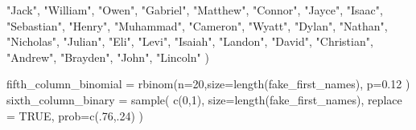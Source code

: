 \documentclass[
]{article}
\newenvironment{Shaded}{\begin{snugshade}}{\end{snugshade}}
\newcommand{\AttributeTok}[1]{\textcolor[rgb]{0.77,0.63,0.00}{#1}}
\newcommand{\ConstantTok}[1]{\textcolor[rgb]{0.00,0.00,0.00}{#1}}
\newcommand{\DecValTok}[1]{\textcolor[rgb]{0.00,0.00,0.81}{#1}}
\newcommand{\FloatTok}[1]{\textcolor[rgb]{0.00,0.00,0.81}{#1}}
\newcommand{\FunctionTok}[1]{\textcolor[rgb]{0.00,0.00,0.00}{#1}}
\newcommand{\NormalTok}[1]{#1}
\newcommand{\OtherTok}[1]{\textcolor[rgb]{0.56,0.35,0.01}{#1}}
\newcommand{\StringTok}[1]{\textcolor[rgb]{0.31,0.60,0.02}{#1}}
\begin{document}
\begin{Shaded}
\begin{Highlighting}[]
  \StringTok{"Jack"}\NormalTok{, }\StringTok{"William"}\NormalTok{, }\StringTok{"Owen"}\NormalTok{, }\StringTok{"Gabriel"}\NormalTok{, }\StringTok{"Matthew"}\NormalTok{, }\StringTok{"Connor"}\NormalTok{, }\StringTok{"Jayce"}\NormalTok{, }
  \StringTok{"Isaac"}\NormalTok{, }\StringTok{"Sebastian"}\NormalTok{, }\StringTok{"Henry"}\NormalTok{, }\StringTok{"Muhammad"}\NormalTok{, }\StringTok{"Cameron"}\NormalTok{, }\StringTok{"Wyatt"}\NormalTok{, }
  \StringTok{"Dylan"}\NormalTok{, }\StringTok{"Nathan"}\NormalTok{, }\StringTok{"Nicholas"}\NormalTok{, }\StringTok{"Julian"}\NormalTok{, }\StringTok{"Eli"}\NormalTok{, }\StringTok{"Levi"}\NormalTok{, }\StringTok{"Isaiah"}\NormalTok{, }
  \StringTok{"Landon"}\NormalTok{, }\StringTok{"David"}\NormalTok{, }\StringTok{"Christian"}\NormalTok{, }\StringTok{"Andrew"}\NormalTok{, }\StringTok{"Brayden"}\NormalTok{, }\StringTok{"John"}\NormalTok{, }
  \StringTok{"Lincoln"}
\NormalTok{)}


\NormalTok{fifth\_column\_binomial }\OtherTok{=} \FunctionTok{rbinom}\NormalTok{(}\AttributeTok{n=}\DecValTok{20}\NormalTok{,}\AttributeTok{size=}\FunctionTok{length}\NormalTok{(fake\_first\_names), }\AttributeTok{p=}\FloatTok{0.12}\NormalTok{ )}
\NormalTok{sixth\_column\_binary }\OtherTok{=} \FunctionTok{sample}\NormalTok{(}
   \FunctionTok{c}\NormalTok{(}\DecValTok{0}\NormalTok{,}\DecValTok{1}\NormalTok{),}
   \AttributeTok{size=}\FunctionTok{length}\NormalTok{(fake\_first\_names),}
   \AttributeTok{replace =} \ConstantTok{TRUE}\NormalTok{,}
   \AttributeTok{prob=}\FunctionTok{c}\NormalTok{(.}\DecValTok{76}\NormalTok{,.}\DecValTok{24}\NormalTok{)}
\NormalTok{ )}


\end{Highlighting}
\end{Shaded}
\end{document}
